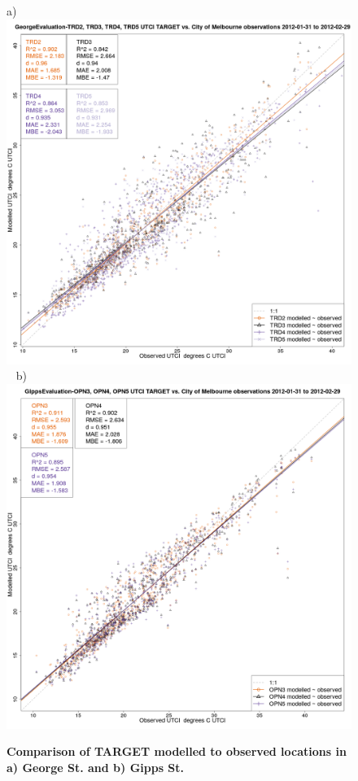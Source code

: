 \documentclass[final,3p,times,authoryear]{elsarticle}
\begin{document}
\begin{figure}[!htbp]
a) \includegraphics[scale=0.15]{images/Eval/GeorgeEvaluation-ErrorPlots-UTCI_Single.png}
~ b)
\includegraphics[scale=0.15]{images/Eval/GippsEvaluation-ErrorPlots-UTCI_Single.png}

\caption{\bf Comparison of TARGET modelled  to observed locations in a) George St. and b) Gipps St.}    
 \label{fig:utcieval} 
\end{figure} 
\end{document}
